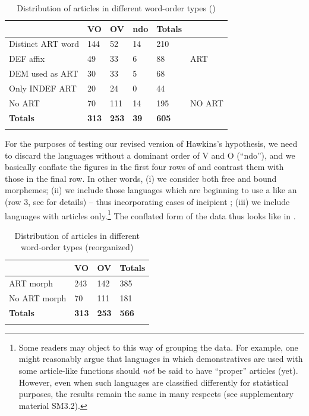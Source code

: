 \documentclass[output=paper]{langsci/langscibook}
\begin{document}
\begin{table}
\begin{tabularx}{.8\textwidth}{lYYYYl}
\lsptoprule
& VO &  OV &  ndo &  Totals\\
\midrule
Distinct ART word & 144 & 52 & 14 & 210 & \\
DEF affix & 49 & 33 & 6 & 88 & ART\\
DEM used as ART & 30 & 33 & 5 & 68 & \\
Only INDEF ART & 20 & 24 & 0 & 44 & \\
\midrule
No ART & 70 & 111 & 14 & 195 & NO ART\\
\midrule
\textbf{Totals} & \textbf{313} & \textbf{253} & \textbf{39} & \textbf{605} & \\
\lspbottomrule
\end{tabularx}
\caption{Distribution of articles in different word-order types (\citealt{Dryer2013_Def,Dryer2013_OV})}
\label{tab:ksb:1}
\end{table} 

For the purposes of testing our revised version of Hawkins’s hypothesis, we need to discard the languages without a dominant order of V and O (“ndo”), and we basically conflate the figures in the first four rows of  and contrast them with those in the final row. In other words, (i) we consider both free and bound  morphemes; (ii) we include those languages which are beginning to use a  like an  (row 3, see \citealt{Dryer2013_Def} for details) – thus incorporating cases of incipient ; (iii) we include languages with  articles only.\footnote{Some readers may object to this way of grouping the data. For example, one might reasonably argue that languages in which demonstratives are used with some article-like functions should \textit{not} be said to have “proper” articles (yet). However, even when such languages are classified differently for statistical purposes, the results remain the same in many respects (see supplementary material SM3.2).} The conflated form of the data thus looks like in .

\begin{table} 

\begin{tabularx}{.8\textwidth}{lYYY}
\lsptoprule
& VO  & OV & Totals\\
\midrule
ART morph & 243 & 142 & 385\\
No ART morph & 70 & 111 & 181\\
\midrule 
\textbf{Totals} & \textbf{313} & \textbf{253} & \textbf{566}\\
\lspbottomrule
\end{tabularx} 
\caption{Distribution of articles in different word-order types (reorganized)}
\label{tab:ksb:2}
\end{table} 
\end{document}
